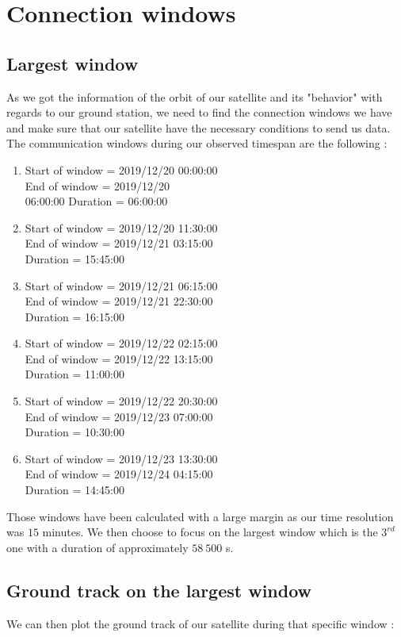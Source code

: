 \documentclass[a4paper,12pt,calibri,oneside,openany]{book}
\theoremstyle{break}
\begin{document}
\section{Connection windows}
\subsection{Largest window}
As we got the information of the orbit of our satellite and its "behavior" with regards to our ground station, we need to find the connection windows we have and make sure that our satellite have the necessary conditions to send us data. The communication windows during our observed timespan are the following :
\begin{enumerate}
	\item Start of window = 2019/12/20 00:00:00\\ End of window = 2019/12/20\\ 06:00:00 Duration = 06:00:00
	\item Start of window = 2019/12/20 11:30:00\\ End of window = 2019/12/21 03:15:00\\ Duration = 15:45:00
	\item Start of window = 2019/12/21 06:15:00\\ End of window = 2019/12/21 22:30:00\\ Duration = 16:15:00
	\item Start of window = 2019/12/22 02:15:00\\ End of window = 2019/12/22 13:15:00\\ Duration = 11:00:00
	\item Start of window = 2019/12/22 20:30:00\\ End of window = 2019/12/23 07:00:00\\ Duration = 10:30:00
	\item Start of window = 2019/12/23 13:30:00\\ End of window = 2019/12/24 04:15:00\\ Duration = 14:45:00
\end{enumerate}

Those windows have been calculated with a large margin as our time resolution was $15$ minutes. We then choose to focus on the largest window which is the $3^{rd}$ one with a duration of approximately $58\ 500$ s.
\newpage
\subsection{Ground track on the largest window}
 We can then plot the ground track of our satellite during that specific window :
\end{document}
